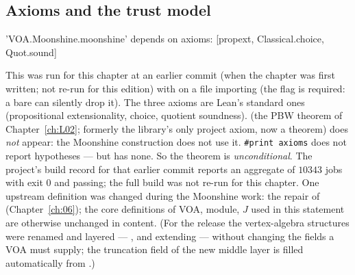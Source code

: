 \subsection{Axioms and the trust model}

\begin{plaincode}
'VOA.Moonshine.moonshine' depends on axioms: [propext, Classical.choice, Quot.sound]
\end{plaincode}
This was run for this chapter at an earlier commit (when the chapter was first written; not re-run for this edition) with
 on a file importing 
(the flag is required: a bare  can silently drop it).  The three axioms are Lean's
standard ones (propositional extensionality, choice, quotient soundness).   (the PBW theorem of
Chapter~\ref{ch:L02}; formerly the library's only project axiom, now a theorem) does \emph{not} appear: the Moonshine construction does not use it.
\texttt{\#print axioms} does not report hypotheses — but  has none.  So the theorem is
\emph{unconditional}.  The project's build record for that earlier commit reports an aggregate
 of $10343$ jobs with exit $0$ and  passing; the full
build was not re-run for this chapter.  One upstream definition was changed during the Moonshine work:
the repair of  (Chapter~\ref{ch:06}); the core definitions of
VOA, module, $J$ used in this statement are otherwise unchanged in content.  (For the release the vertex-algebra
structures were renamed and layered --- , and  extending
 --- without changing the fields a VOA must supply; the truncation field of the new
middle layer is filled automatically from .)

